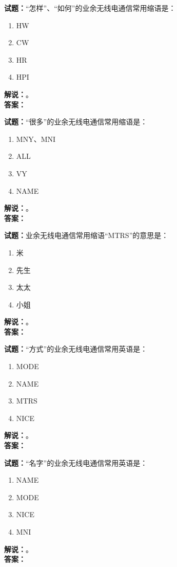 \documentclass{ctexbook}
\begin{document}
\noindent\textbf{试题：}“怎样”、“如何”的业余无线电通信常用缩语是：
\begin{enumerate}[leftmargin=3em]
  \item HW
  \item CW
  \item HR
  \item HPI
\end{enumerate}
\noindent\textbf{解说：}\textbf{}。\\\noindent\textbf{答案：}

\vspace{\baselineskip}

\noindent\textbf{试题：}“很多”的业余无线电通信常用缩语是：
\begin{enumerate}[leftmargin=3em]
  \item MNY、MNI
  \item ALL
  \item VY
  \item NAME
\end{enumerate}
\noindent\textbf{解说：}\textbf{}。\\\noindent\textbf{答案：}

\vspace{\baselineskip}

\noindent\textbf{试题：}业余无线电通信常用缩语“MTRS”的意思是：
\begin{enumerate}[leftmargin=3em]
  \item 米
  \item 先生
  \item 太太
  \item 小姐
\end{enumerate}
\noindent\textbf{解说：}\textbf{}。\\\noindent\textbf{答案：}

\vspace{\baselineskip}

\noindent\textbf{试题：}“方式”的业余无线电通信常用英语是：
\begin{enumerate}[leftmargin=3em]
  \item MODE
  \item NAME
  \item MTRS
  \item NICE
\end{enumerate}
\noindent\textbf{解说：}\textbf{}。\\\noindent\textbf{答案：}

\vspace{\baselineskip}

\noindent\textbf{试题：}“名字”的业余无线电通信常用英语是：
\begin{enumerate}[leftmargin=3em]
  \item NAME
  \item MODE
  \item NICE
  \item MNI
\end{enumerate}
\noindent\textbf{解说：}\textbf{}。\\\noindent\textbf{答案：}
\end{document}

